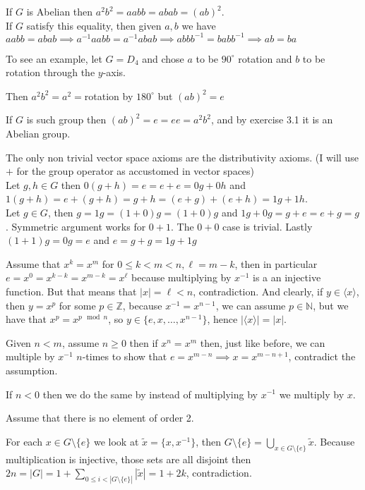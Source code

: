 \begin{cExercise}
	\begin{cPart}
		If $G$ is Abelian then $a^2b^2=aabb=abab=(ab)^2$.\\
		If $G$ satisfy this equality, then given $a,b$ we have $aabb=abab\implies a^{-1}aabb=a^{-1}abab\implies abbb^{-1}=babb^{-1}\implies ab=ba$
		
		To see an example, let $G=D_4$ and chose $a$ to be $90^\circ$ rotation and $b$ to be rotation through the $y$-axis.
		
		Then $a^2b^2=a^2=$rotation by $180^\circ$ but $(ab)^2=e$ 
	\end{cPart}
	\begin{cPart}
		If $G$ is such group then $(ab)^2=e=ee=a^2b^2$, and by exercise 3.1 it is an Abelian group.
	\end{cPart}
	\begin{cPart}
		The only non trivial vector space axioms are the distributivity axioms. (I will use $+$ for the group operator as accustomed in vector spaces) \\
		Let $g,h\in G$ then $0(g+h)=e=e+e=0g+0h$ and $1(g+h)=e+(g+h)=g+h=(e+g)+(e+h)=1g+1h$.\\
		Let $g\in G$, then $g=1g=(1+0)g=(1+0)g$ and $1g+0g=g+e=e+g=g$. Symmetric argument works for $0+1$. The $0+0$ case is trivial. Lastly $(1+1)g=0g=e$ and $e=g+g=1g+1g$
	\end{cPart}
\end{cExercise}
\begin{cExercise}
	\begin{cPart}
		Assume that $x^k=x^m$ for $0\le k<m<n, \ell=m-k$, then in particular $e=x^0=x^{k-k}=x^{m-k}=x^{\ell}$ because multiplying by $x^{-1}$ is a an injective function.
		But that means that $|x|=\ell<n$, contradiction. And clearly, if $y\in \langle x\rangle$, then $y=x^p$ for some $p\in \mathbb Z$, because $x^{-1}=x^{n-1}$, we can assume $p\in\mathbb N$, but we have that $x^p=x^{p\mod n}$, so $y\in\{e,x,\ldots,x^{n-1}\}$, hence $|\langle x\rangle|=|x|$.
	\end{cPart}
	\begin{cPart}
		Given $n<m$, assume $n\ge 0$ then if $x^n=x^m$ then, just like before, we can multiple by $x^{-1}$ $n$-times to show that $e=x^{m-n}\implies x=x^{m-n+1}$, contradict the assumption.
		
		If $n<0$ then we do the same by instead of multiplying by $x^{-1}$ we multiply by $x$.
	\end{cPart}
	\begin{cPart}
		Assume that there is no element of order 2.
		
		For each $x\in G\setminus\{e\}$ we look at $\tilde x=\{x,x^{-1}\}$, then $G\setminus\{e\}=\bigcup_{x\in G\setminus\{e\}}\tilde x$. Because multiplication is injective, those sets are all disjoint then $2n=|G|=1+\sum_{0\le i <|G\setminus\{e\}|}|\tilde x|=1+2k$, contradiction.
	\end{cPart}
\end{cExercise}
